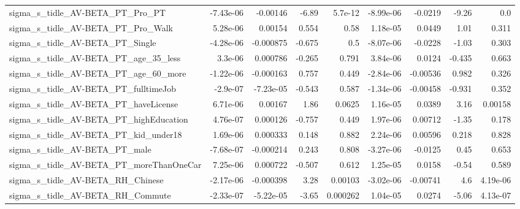 \begin{tabular}{lrrrrrrrr}
sigma\_s\_tidle\_AV-BETA\_PT\_Pro\_PT                    &   -7.43e-06 &     -0.00146 &     -6.89 &  5.7e-12 &  -8.99e-06 &     -0.0219 &        -9.26 &           0.0 \\
sigma\_s\_tidle\_AV-BETA\_PT\_Pro\_Walk                  &    5.28e-06 &      0.00154 &     0.554 &     0.58 &   1.18e-05 &      0.0449 &         1.01 &         0.311 \\
sigma\_s\_tidle\_AV-BETA\_PT\_Single                    &   -4.28e-06 &    -0.000875 &    -0.675 &      0.5 &  -8.07e-06 &     -0.0228 &        -1.03 &         0.303 \\
sigma\_s\_tidle\_AV-BETA\_PT\_age\_35\_less               &     3.3e-06 &     0.000786 &    -0.265 &    0.791 &   3.84e-06 &      0.0124 &       -0.435 &         0.663 \\
sigma\_s\_tidle\_AV-BETA\_PT\_age\_60\_more               &   -1.22e-06 &    -0.000163 &     0.757 &    0.449 &  -2.84e-06 &    -0.00536 &        0.982 &         0.326 \\
sigma\_s\_tidle\_AV-BETA\_PT\_fulltimeJob               &    -2.9e-07 &    -7.23e-05 &    -0.543 &    0.587 &  -1.34e-06 &    -0.00458 &       -0.931 &         0.352 \\
sigma\_s\_tidle\_AV-BETA\_PT\_haveLicense               &    6.71e-06 &      0.00167 &      1.86 &   0.0625 &   1.16e-05 &      0.0389 &         3.16 &       0.00158 \\
sigma\_s\_tidle\_AV-BETA\_PT\_highEducation             &    4.76e-07 &     0.000126 &    -0.757 &    0.449 &   1.97e-06 &     0.00712 &        -1.35 &         0.178 \\
sigma\_s\_tidle\_AV-BETA\_PT\_kid\_under18               &    1.69e-06 &     0.000333 &     0.148 &    0.882 &   2.24e-06 &     0.00596 &        0.218 &         0.828 \\
sigma\_s\_tidle\_AV-BETA\_PT\_male                      &   -7.68e-07 &    -0.000214 &     0.243 &    0.808 &  -3.27e-06 &     -0.0125 &         0.45 &         0.653 \\
sigma\_s\_tidle\_AV-BETA\_PT\_moreThanOneCar            &    7.25e-06 &     0.000722 &    -0.507 &    0.612 &   1.25e-05 &      0.0158 &        -0.54 &         0.589 \\
sigma\_s\_tidle\_AV-BETA\_RH\_Chinese                   &   -2.17e-06 &    -0.000398 &      3.28 &  0.00103 &  -3.02e-06 &    -0.00741 &          4.6 &      4.19e-06 \\
sigma\_s\_tidle\_AV-BETA\_RH\_Commute                   &   -2.33e-07 &    -5.22e-05 &     -3.65 & 0.000262 &   1.04e-05 &      0.0274 &        -5.06 &      4.13e-07 \\

\end{tabular}
